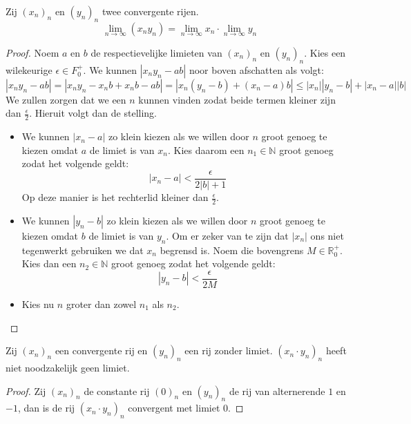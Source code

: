 \documentclass[main.tex]{subfiles}
\begin{document}
\begin{st}
  \label{st:product-van-limieten-is-limiet-van-product}
  Zij $(x_{n})_{n}$ en $(y_{n})_{n}$ twee convergente rijen.
  \[ \lim_{n \rightarrow \infty}(x_{n}y_{n}) = \lim_{n\rightarrow \infty}x_{n} \cdot \lim_{n\rightarrow \infty}y_{n} \]

  \begin{proof}
    Noem $a$ en $b$ de respectievelijke limieten van $(x_{n})_{n}$ en $(y_{n})_{n}$.
    Kies een wilekeurige $\epsilon \in F_{0}^{+}$.
    We kunnen $|x_{n}y_{n}-ab|$ noor boven afschatten als volgt:
    \[ |x_{n}y_{n}-ab| = |x_{n}y_{n} -x_{n}b + x_{n}b -ab| = |x_{n}(y_{n}-b) + (x_{n}-a)b| \le |x_{n}||y_{n}-b| + |x_{n}-a||b| \]
    We zullen zorgen dat we een $n$ kunnen vinden zodat beide termen kleiner zijn dan $\frac{\epsilon}{2}$. Hieruit volgt dan de stelling.
    \begin{itemize}
    \item We kunnen $|x_{n}-a|$ zo klein kiezen als we willen door $n$ groot genoeg te kiezen omdat $a$ de limiet is van $x_{n}$.
      Kies daarom een $n_{1}\in\mathbb{N}$ groot genoeg zodat het volgende geldt:
      \[ |x_{n}-a| < \frac{\epsilon}{2|b|+1} \]
      Op deze manier is het rechterlid kleiner dan $\frac{\epsilon}{2}$.
    \item We kunnen $|y_{n}-b|$ zo klein kiezen als we willen door $n$ groot genoeg te kiezen omdat $b$ de limiet is van $y_{n}$.
      Om er zeker van te zijn dat $|x_{n}|$ ons niet tegenwerkt gebruiken we dat $x_{n}$ begrensd is.
      Noem die bovengrens $M\in\mathbb{R}_{0}^{+}$.
      Kies dan een $n_{2}\in\mathbb{N}$ groot genoeg zodat het volgende geldt:
      \[ |y_{n}-b| < \frac{\epsilon}{2M} \]
    \item Kies nu $n$ groter dan zowel $n_{1}$ als $n_{2}$.
    \end{itemize}
  \end{proof}
\end{st}

\begin{tvb}
  Zij $(x_{n})_{n}$ een convergente rij en $(y_{n})_{n}$ een rij zonder limiet.
  $(x_{n}\cdot y_{n})_{n}$ heeft niet noodzakelijk geen limiet.

  \begin{proof}
    Zij $(x_{n})_{n}$ de constante rij $(0)_{n}$ en $(y_{n})_{n}$ de rij van alternerende $1$ en $-1$, dan is de rij $(x_{n}\cdot y_{n})_{n}$ convergent met limiet $0$.
  \end{proof}
\end{tvb}
  
\end{document}
